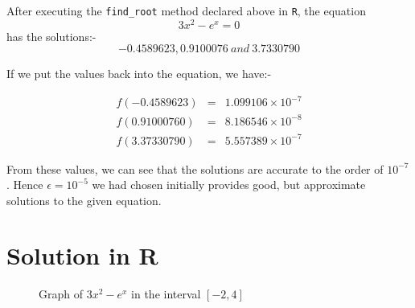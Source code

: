 \documentclass[10pt]{article}
\begin{document}
After executing the \verb+find_root+ method declared above in \verb+R+, the equation $$3x^2 - e^x = 0$$ has the solutions:-  $$-0.4589623,  0.9100076\: and\: 3.7330790$$ \medskip

If we put the values back into the equation, we have:- 

\begin{eqnarray}
	f(-0.4589623) &=& 1.099106 \times 10^{-7} \\
	f(0.91000760) &=& 8.186546 \times 10^{-8} \\
	f(3.37330790) &=& 5.557389 \times 10^{-7}
\end{eqnarray}

From these values, we can see that the solutions are accurate to the order of $10^{-7}$. Hence $ \epsilon = 10^{-5}$ we had chosen initially provides good, but approximate solutions to the given equation.
\section{Solution in R}
\begin{figure}[H]
	\centering
	\caption{Graph of $3x^2 - e^x$ in the interval $[-2,4]$}
\end{figure}
\end{document}
